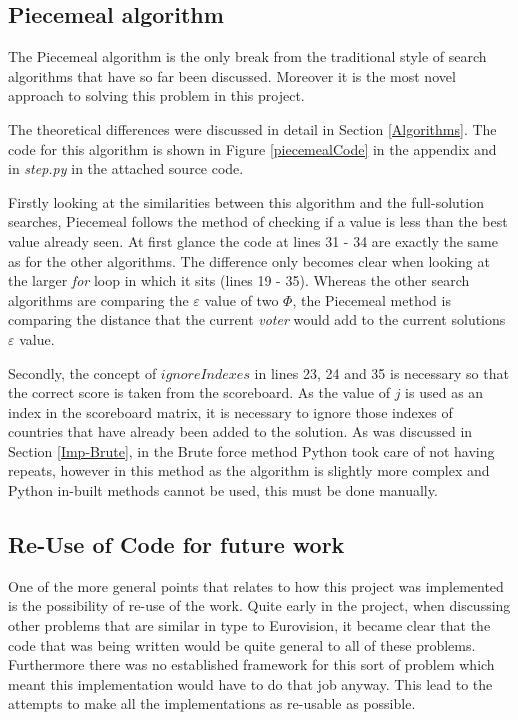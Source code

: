 \documentclass[12pt]{report}
\begin{document}
\subsection{Piecemeal algorithm}\label{Imp-Piecemeal}
The Piecemeal algorithm is the only break from the traditional style of search algorithms that have so far been discussed. Moreover it is the most novel approach to solving this problem in this project.

The theoretical differences were discussed in detail in Section \ref{Algorithms}. The code for this algorithm is shown in Figure \ref{piecemealCode} in the appendix and in \textit{step.py} in the attached source code.

Firstly looking at the similarities between this algorithm and the full-solution searches, Piecemeal follows the method of checking if a value is less than the best value already seen. At first glance the code at lines 31 - 34 are exactly the same as for the other algorithms. The difference only becomes clear when looking at the larger \textit{for} loop in which it sits (lines 19 - 35). Whereas the other search algorithms are comparing the $\varepsilon$ value of two $\Phi$, the Piecemeal method is comparing the distance that the current \textit{voter} would add to the current solutions $\varepsilon$ value.

Secondly, the concept of $ignoreIndexes$ in lines 23, 24 and 35 is necessary so that the correct score is taken from the scoreboard. As the value of $j$ is used as an index in the scoreboard matrix, it is necessary to ignore those indexes of countries that have already been added to the solution. As was discussed in Section \ref{Imp-Brute}, in the Brute force method Python took care of not having repeats, however in this method as the algorithm is slightly more complex and Python in-built methods cannot be used, this must be done manually.

\subsection{Re-Use of Code for future work}\label{Imp-Reuse}
One of the more general points that relates to how this project was implemented is the possibility of re-use of the work. Quite early in the project, when discussing other problems that are similar in type to Eurovision, it became clear that the code that was being written would be quite general to all of these problems. Furthermore there was no established framework for this sort of problem which meant this implementation would have to do that job anyway. This lead to the attempts to make all the implementations as re-usable as possible.
\end{document}
